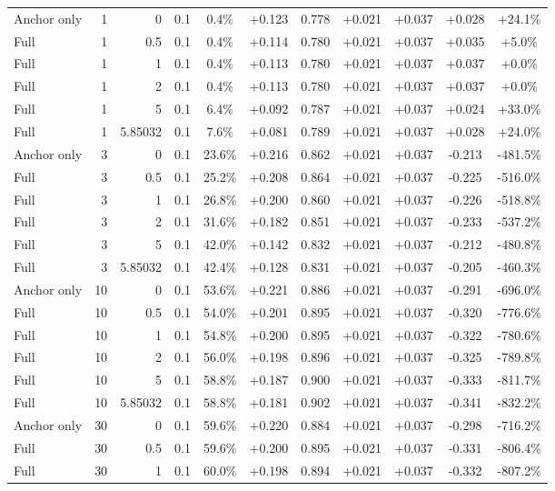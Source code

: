 \begin{table}[htbp]
\begin{tabular}{lrrrccccccc}
Anchor only & 1 & 0 & 0.1 & 0.4\% & +0.123 & 0.778 & +0.021 & +0.037 & +0.028 & +24.1\% \\
Full & 1 & 0.5 & 0.1 & 0.4\% & +0.114 & 0.780 & +0.021 & +0.037 & +0.035 & +5.0\% \\
Full & 1 & 1 & 0.1 & 0.4\% & +0.113 & 0.780 & +0.021 & +0.037 & +0.037 & +0.0\% \\
Full & 1 & 2 & 0.1 & 0.4\% & +0.113 & 0.780 & +0.021 & +0.037 & +0.037 & +0.0\% \\
Full & 1 & 5 & 0.1 & 6.4\% & +0.092 & 0.787 & +0.021 & +0.037 & +0.024 & +33.0\% \\
Full & 1 & 5.85032 & 0.1 & 7.6\% & +0.081 & 0.789 & +0.021 & +0.037 & +0.028 & +24.0\% \\
Anchor only & 3 & 0 & 0.1 & 23.6\% & +0.216 & 0.862 & +0.021 & +0.037 & -0.213 & -481.5\% \\
Full & 3 & 0.5 & 0.1 & 25.2\% & +0.208 & 0.864 & +0.021 & +0.037 & -0.225 & -516.0\% \\
Full & 3 & 1 & 0.1 & 26.8\% & +0.200 & 0.860 & +0.021 & +0.037 & -0.226 & -518.8\% \\
Full & 3 & 2 & 0.1 & 31.6\% & +0.182 & 0.851 & +0.021 & +0.037 & -0.233 & -537.2\% \\
Full & 3 & 5 & 0.1 & 42.0\% & +0.142 & 0.832 & +0.021 & +0.037 & -0.212 & -480.8\% \\
Full & 3 & 5.85032 & 0.1 & 42.4\% & +0.128 & 0.831 & +0.021 & +0.037 & -0.205 & -460.3\% \\
Anchor only & 10 & 0 & 0.1 & 53.6\% & +0.221 & 0.886 & +0.021 & +0.037 & -0.291 & -696.0\% \\
Full & 10 & 0.5 & 0.1 & 54.0\% & +0.201 & 0.895 & +0.021 & +0.037 & -0.320 & -776.6\% \\
Full & 10 & 1 & 0.1 & 54.8\% & +0.200 & 0.895 & +0.021 & +0.037 & -0.322 & -780.6\% \\
Full & 10 & 2 & 0.1 & 56.0\% & +0.198 & 0.896 & +0.021 & +0.037 & -0.325 & -789.8\% \\
Full & 10 & 5 & 0.1 & 58.8\% & +0.187 & 0.900 & +0.021 & +0.037 & -0.333 & -811.7\% \\
Full & 10 & 5.85032 & 0.1 & 58.8\% & +0.181 & 0.902 & +0.021 & +0.037 & -0.341 & -832.2\% \\
Anchor only & 30 & 0 & 0.1 & 59.6\% & +0.220 & 0.884 & +0.021 & +0.037 & -0.298 & -716.2\% \\
Full & 30 & 0.5 & 0.1 & 59.6\% & +0.200 & 0.895 & +0.021 & +0.037 & -0.331 & -806.4\% \\
Full & 30 & 1 & 0.1 & 60.0\% & +0.198 & 0.894 & +0.021 & +0.037 & -0.332 & -807.2\% \\

\end{tabular}
\end{table}
